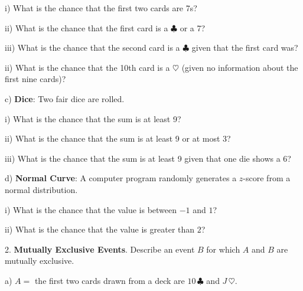 \documentclass[10pt]{article}
\begin{document}
\hspace{20pt} i) What is the chance that the first two cards are 7s?
\vspace{.5in}

\hspace{20pt} ii) What is the chance that the first card is a $\clubsuit$ or a 7?
\vspace{.45in}

\hspace{20pt} iii) What is the chance that the second card is a $\clubsuit$ given that the first card was?
\vspace{.5in}

\hspace{20pt} ii) What is the chance that the 10th card is a $\heartsuit$ (given no information about 
  the first nine cards)?
\vspace{.5in}

\hspace{10pt} c) \textbf{Dice}: Two fair dice are rolled.

\hspace{20pt} i) What is the chance that the sum is at least 9?
\vspace{.5in}

\hspace{20pt} ii) What is the chance that the sum is at least 9 or at most 3?
\vspace{.45in}

\hspace{20pt} iii) What is the chance that the sum is at least 9 given that one die shows a 6?
\vspace{.5in}

\hspace{10pt} d) \textbf{Normal Curve}:
  A computer program randomly generates a $z$-score from a normal distribution.

\hspace{20pt} i) What is the chance that the value is between $-1$ and $1$?
\vspace{.4in}

\hspace{20pt} ii) What is the chance that the value is greater than $2$?
\vfill
\eject

2. \textbf{Mutually Exclusive Events}.  Describe an event $B$ for which $A$ and $B$ are 
mutually exclusive.

\hspace{10pt} a) $A=$ the first two cards drawn from a deck are $10\,\clubsuit$ and $J\,\heartsuit$.
\vspace{.3in}
\end{document}
